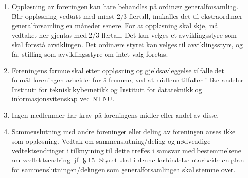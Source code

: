 \documentclass[a4paper,11pt,titlepage]{article}
\begin{document}
\begin{enumerate}
\item Oppløsning av foreningen kan bare behandles på ordinær generalforsamling. Blir oppløsning vedtatt med minst 2/3 flertall, innkalles det til ekstraordinær generalforsamling en måneder senere. For at oppløsning skal skje, må vedtaket her gjentas med 2/3 flertall. Det kan velges et avviklingsstyre som skal forestå avviklingen. Det ordinære styret kan velges til avviklingsstyre, og får stilling som avviklingsstyre om intet valg foretas. 

\item Foreningens formue skal etter oppløsning og gjeldsavleggelse tilfalle det formål foreningen arbeider for å fremme, ved at midlene tilfaller i like andeler Institutt for teknisk kybernetikk og Institutt for datateknikk og informasjonsvitenskap ved NTNU.

\item Ingen medlemmer har krav på foreningens midler eller andel av disse.

\item Sammenslutning med andre foreninger eller deling av foreningen anses ikke som oppløsning. Vedtak om sammenslutning/deling og nødvendige vedtektsendringer i tilknytning til dette treffes i samsvar med bestemmelsene om vedtektsendring, jf. § 15. Styret skal i denne forbindelse utarbeide en plan for sammenslutningen/delingen som generalforsamlingen skal stemme over.

\end{enumerate}
\end{document}
